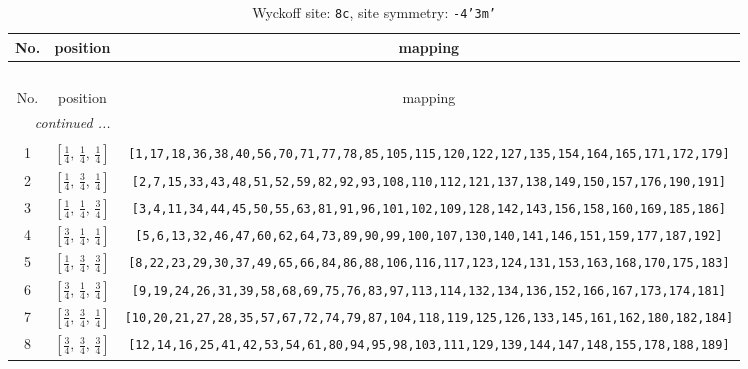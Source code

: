 \documentclass[fleqn,8pt]{jsarticle}
\begin{document}
\begin{longtable}{ccc}
\caption{Wyckoff site: {\tt 8c}, site symmetry: {\tt -4'3m'}}
 \\
 \hline \hline
No. & position & mapping \\ \hline \endfirsthead

\multicolumn{2}{l}{\tablename\ \thetable{}} \\
 \hline \hline
No. & position & mapping \\ \hline \endhead

 \hline \hline
\multicolumn{2}{r}{\footnotesize\it continued ...} \\ \endfoot

 \hline \hline
\multicolumn{2}{r}{} \\ \endlastfoot

1 & $\left[ \frac{1}{4},\, \frac{1}{4},\, \frac{1}{4} \right]$ & {\tt [1,17,18,36,38,40,56,70,71,77,78,85,105,115,120,122,127,135,154,164,165,171,172,179]} \\ \hline
2 & $\left[ \frac{1}{4},\, \frac{3}{4},\, \frac{1}{4} \right]$ & {\tt [2,7,15,33,43,48,51,52,59,82,92,93,108,110,112,121,137,138,149,150,157,176,190,191]} \\ \hline
3 & $\left[ \frac{1}{4},\, \frac{1}{4},\, \frac{3}{4} \right]$ & {\tt [3,4,11,34,44,45,50,55,63,81,91,96,101,102,109,128,142,143,156,158,160,169,185,186]} \\ \hline
4 & $\left[ \frac{3}{4},\, \frac{1}{4},\, \frac{1}{4} \right]$ & {\tt [5,6,13,32,46,47,60,62,64,73,89,90,99,100,107,130,140,141,146,151,159,177,187,192]} \\ \hline
5 & $\left[ \frac{1}{4},\, \frac{3}{4},\, \frac{3}{4} \right]$ & {\tt [8,22,23,29,30,37,49,65,66,84,86,88,106,116,117,123,124,131,153,163,168,170,175,183]} \\ \hline
6 & $\left[ \frac{3}{4},\, \frac{1}{4},\, \frac{3}{4} \right]$ & {\tt [9,19,24,26,31,39,58,68,69,75,76,83,97,113,114,132,134,136,152,166,167,173,174,181]} \\ \hline
7 & $\left[ \frac{3}{4},\, \frac{3}{4},\, \frac{1}{4} \right]$ & {\tt [10,20,21,27,28,35,57,67,72,74,79,87,104,118,119,125,126,133,145,161,162,180,182,184]} \\ \hline
8 & $\left[ \frac{3}{4},\, \frac{3}{4},\, \frac{3}{4} \right]$ & {\tt [12,14,16,25,41,42,53,54,61,80,94,95,98,103,111,129,139,144,147,148,155,178,188,189]} \\
\end{longtable}
\renewcommand{\arraystretch}{1.2}
\end{document}
